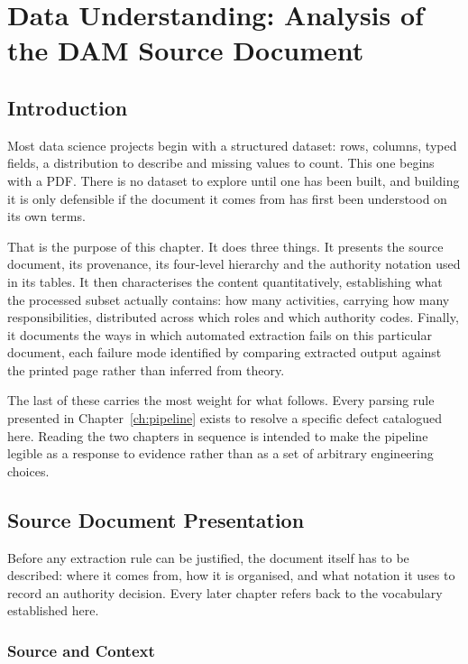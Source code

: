 \chapter{Data Understanding: Analysis of the DAM Source Document}
\label{ch:datasource}
\minitoc

\section*{Introduction}

Most data science projects begin with a structured dataset: rows, columns, typed
fields, a distribution to describe and missing values to count. This one begins with a
PDF. There is no dataset to explore until one has been built, and building it is only
defensible if the document it comes from has first been understood on its own terms.

That is the purpose of this chapter. It does three things. It presents the source
document, its provenance, its four-level hierarchy and the authority notation used in its
tables. It then characterises the content quantitatively, establishing what the processed
subset actually contains: how many activities, carrying how many responsibilities,
distributed across which roles and which authority codes. Finally, it documents the ways
in which automated extraction fails on this particular document, each failure mode
identified by comparing extracted output against the printed page rather than inferred
from theory.

The last of these carries the most weight for what follows. Every parsing rule presented
in Chapter~\ref{ch:pipeline} exists to resolve a specific defect catalogued here. Reading
the two chapters in sequence is intended to make the pipeline legible as a response to
evidence rather than as a set of arbitrary engineering choices.

\section{Source Document Presentation}

Before any extraction rule can be justified, the document itself has to be described: where
it comes from, how it is organised, and what notation it uses to record an authority
decision. Every later chapter refers back to the vocabulary established here.

\subsection{Source and Context}

